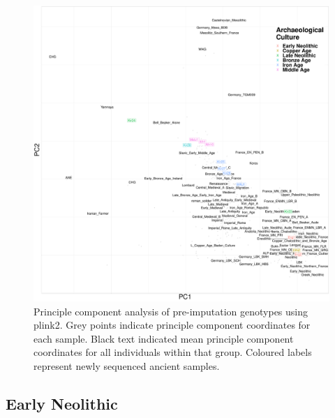 \begin{figure}[htp]
    \centering
    \includegraphics[width=1.0\textwidth]{../images/chapter4/plink_PCA.pdf}
    \caption{Principle component analysis of pre-imputation genotypes using plink2. Grey points indicate principle component coordinates for each sample. Black text indicated mean principle component coordinates for all individuals within that group. Coloured labels represent newly sequenced ancient samples.}
    \label{fig:plink_PCA}
\end{figure}

\subsection{Early Neolithic}

